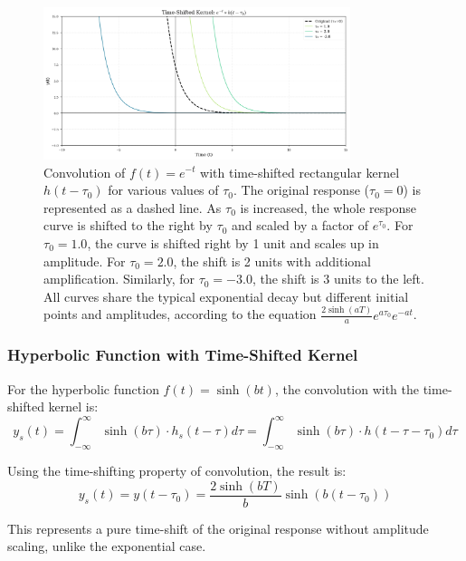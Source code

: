 \documentclass{article}
\begin{document}
	\begin{figure}[htbp]
		\centering
		\includegraphics[width=0.8\textwidth]{figs/exp_time_shift_extended.png}
		\caption{Convolution of $f(t) = e^{-t}$ with time-shifted rectangular kernel $h(t-\tau_0)$ for various values of $\tau_0$. The original response ($\tau_0 = 0$) is represented as a dashed line. As $\tau_0$ is increased, the whole response curve is shifted to the right by $\tau_0$ and scaled by a factor of $e^{\tau_0}$. For $\tau_0 = 1.0$, the curve is shifted right by 1 unit and scales up in amplitude. For $\tau_0 = 2.0$, the shift is 2 units with additional amplification. Similarly, for $\tau_0 = -3.0$, the shift is 3 units to the left. All curves share the typical exponential decay but different initial points and amplitudes, according to the equation $\frac{2\sinh(aT)}{a}e^{a\tau_0}e^{-at}$.}
		\label{fig:exp_shifted_kernel}
	\end{figure}
	
	\subsubsection{Hyperbolic Function with Time-Shifted Kernel}
	For the hyperbolic function $f(t) = \sinh(bt)$, the convolution with the time-shifted kernel is:
	\begin{equation}
		y_s(t) = \int_{-\infty}^{\infty} \sinh(b\tau) \cdot h_s(t - \tau) d\tau = \int_{-\infty}^{\infty} \sinh(b\tau) \cdot h(t - \tau - \tau_0) d\tau
	\end{equation}
	
	Using the time-shifting property of convolution, the result is:
	\begin{equation}
		y_s(t) = y(t-\tau_0) = \frac{2\sinh(bT)}{b}\sinh(b(t-\tau_0))
	\end{equation}
	
	This represents a pure time-shift of the original response without amplitude scaling, unlike the exponential case.
	
\end{document}

